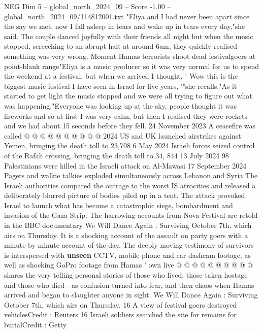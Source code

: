 \begin{textsample}{NEG Dim 5 – global\_north\_2024\_09 – Score -1.00 – global\_north\_2024\_09/114812001.txt}  \label{ex:f5_neg_142}
"Eliya and I had never been apart since the say we met, now I fall asleep in tears and wake up in tears every day,"she said.
The couple danced joyfully with their friends all night but when the music stopped, screeching to an abrupt halt at around 6am, they quickly realised something was very wrong.
Moment Hamas terrorists shoot dead festivalgoers at point-blank range"Eliya is a music producer so it was very normal for us to spend the weekend at a festival, but when we arrived I thought, ' Wow this is the biggest music festival I have seen in Israel for five years, '"she recalls."As it started to get light the music stopped and we were all trying to figure out what was happening."Everyone was looking up at the sky, people thought it was fireworks and so at first I was very calm, but then I realised they were rockets and we had about 15 seconds before they fell. 24 November 2023 A ceasefire was called @ @ @ @ @ @ @ @ @ @ 2024 US and UK launched airstrikes against Yemen, bringing the death toll to 23,708 6 May 2024 Israeli forces seized control of the Rafah crossing, bringing the death toll to 34, 844 13 July 2024 98 Palestinians were killed in the Israeli attack on Al-Mawasi 17 September 2024 Pagers and walkie talkies exploded simultaneously across Lebanon and Syria The Israeli authorities compared the outrage to the worst IS atrocities and released a deliberately blurred picture of bodies piled up in a tent.
The attack provoked Israel to launch what has become a catastrophic siege, bombardment and invasion of the Gaza Strip.
The harrowing accounts from Nova Festival are retold in the BBC documentary We Will Dance Again : Surviving October 7th, which airs on Thursday.
It is a shocking account of the assault on party goers with a minute-by-minute account of the day.
The deeply moving testimony of survivors is interspersed with \textbf{unseen} CCTV, mobile phone and car dashcam footage, as well as shocking GoPro footage from Hamas ' own live @ @ @ @ @ @ @ @ @ @ shares the very telling personal stories of those who lived, those taken hostage and those who died - as confusion turned into fear, and then chaos when Hamas arrived and began to slaughter anyone in sight.
We Will Dance Again : Surviving October 7th, which airs on Thursday. 16 A view of festival goers destroyed vehiclesCredit : Reuters 16 Israeli soldiers searched the site for remains for burialCredit : Getty

\end{textsample}
